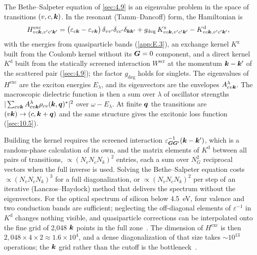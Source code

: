 The Bethe--Salpeter equation of \cref{sec:4.9} is an eigenvalue problem in the space of transitions $(v,c,\bm{k})$. In the resonant (Tamm--Dancoff) form, the Hamiltonian is
\begin{equation}
  H^{\mathrm{exc}}_{vc\bm{k},v'c'\bm{k}'} = \bigl(\varepsilon_{c\bm{k}} - \varepsilon_{v\bm{k}}\bigr)\,\delta_{vv'}\delta_{cc'}\delta_{\bm{k}\bm{k}'}
  + g_{\mathrm{deg}}\,K^{\mathrm{x}}_{vc\bm{k},v'c'\bm{k}'} - K^{\mathrm{d}}_{vc\bm{k},v'c'\bm{k}'} ,
  \label{eq:E.6-Hexc}
\end{equation}
with the energies from quasiparticle bands (\cref{app:E.3}), an exchange kernel $K^{\mathrm{x}}$ built from the Coulomb kernel without its $\bm{G} = 0$ component, and a direct kernel $K^{\mathrm{d}}$ built from the statically screened interaction $W^{\mathrm{scr}}$ at the momentum $\bm{k} - \bm{k}'$ of the scattered pair (\cref{sec:4.9}); the factor $g_{\mathrm{deg}}$ holds for singlets. The eigenvalues of $H^{\mathrm{exc}}$ are the exciton energies $E_\lambda$, and its eigenvectors are the envelopes $A^\lambda_{cv\bm{k}}$. The macroscopic dielectric function is then a sum over $\lambda$ of oscillator strengths $|\sum_{cv\bm{k}}A^\lambda_{cv\bm{k}}\rho_{cv}(\bm{k},\bm{q})^*|^2$ over $\omega - E_\lambda$. At finite $\bm{q}$ the transitions are $(v\bm{k}) \to (c,\bm{k}+\bm{q})$ and the same structure gives the excitonic loss function (\cref{sec:10.5}).

Building the kernel requires the screened interaction $\varepsilon^{-1}_{\bm{G}\bm{G}'}(\bm{k}-\bm{k}')$, which is a random-phase calculation of its own, and the matrix elements of $K^{\mathrm{d}}$ between all pairs of transitions, $\propto (N_vN_cN_k)^2$ entries, each a sum over $N_G^2$ reciprocal vectors when the full inverse is used. Solving the Bethe--Salpeter equation costs $\propto (N_vN_cN_k)^3$ for a full diagonalization, or $\propto (N_vN_cN_k)^2$ per step of an iterative (Lanczos--Haydock) method that delivers the spectrum without the eigenvectors. For the optical spectrum of silicon below \SI{4.5}{eV}, four valence and two conduction bands are sufficient; neglecting the off-diagonal elements of $\varepsilon^{-1}$ in $K^{\mathrm{d}}$ changes nothing visible, and quasiparticle corrections can be interpolated onto the fine grid of 2{,}048 $\bm{k}$ points in the full zone~\cite{albrecht1998ab}. The dimension of $H^{\mathrm{exc}}$ is then $2{,}048\times4\times2 \approx 1.6\times10^4$, and a dense diagonalization of that size takes $\sim 10^{13}$ operations; the $\bm{k}$ grid rather than the cutoff is the bottleneck~\cite{albrecht1998ab}.

